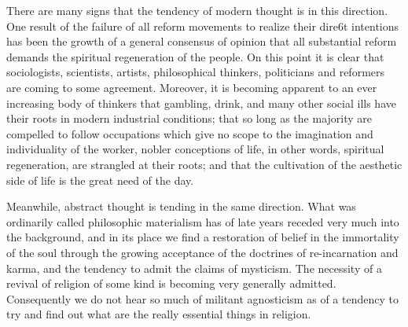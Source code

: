\documentclass{book}
\begin{document}
There are many signs that the tendency of modern thought is in this direction. One result of the failure of all reform movements to realize their dire6t intentions has been the growth of a general consensus of opinion that all substantial reform demands the spiritual regeneration of the people. On this point it is clear that sociologists, scientists, artists, philosophical thinkers, politicians and reformers are coming to some agreement. Moreover, it is becoming apparent to an ever increasing body of thinkers that gambling, drink, and many other social ills have their roots in modern industrial conditions; that so long as the majority are compelled to follow occupations which give no scope to the imagination and individuality of the worker, nobler conceptions of life, in other words, spiritual regeneration, are strangled at their roots; and that the cultivation of the aesthetic side of life is the great need of the day.

Meanwhile, abstract thought is tending in the same direction. What was ordinarily called philosophic materialism has of late years receded very much into the background, and in its place we find a restoration of belief in the immortality of the soul through the growing acceptance of the doctrines of re-incarnation and karma, and the tendency to admit the claims of mysticism. The necessity of a revival of religion of some kind is becoming very generally admitted. Consequently we do not hear so much of militant agnosticism as of a tendency to try and find out what are the really essential things in religion.
\end{document}
